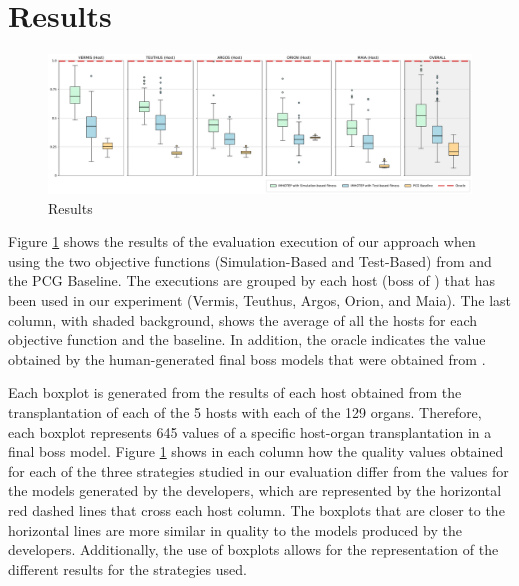 \section{Results}
\label{sec:Results}

\begin{figure}
    \centering
    \includegraphics[width=\textwidth]{Figures/Imhotep_with_legend_and_oracle_average-v4.pdf}
    \caption{Results}
    \label{fig:results}
\end{figure}

Figure \ref{fig:results} shows the results of the evaluation execution of our approach when using the two objective functions (Simulation-Based and Test-Based) from \ApproachName{} and the PCG Baseline. The executions are grouped by each host (boss of \CaseStudy{}) that has been used in our experiment (Vermis, Teuthus, Argos, Orion, and Maia). The last column, with shaded background, shows the average of all the hosts for each objective function and the baseline. In addition, the oracle indicates the value obtained by the human-generated final boss models that were obtained from \CaseStudy{}. 

Each boxplot is generated from the results of each host obtained from the transplantation of each of the 5 hosts with each of the 129 organs. Therefore, each boxplot represents 645 values of a specific host-organ transplantation in a final boss model. Figure \ref{fig:results} shows in each column how the quality values obtained for each of the three strategies studied in our evaluation differ from the values for the models generated by the developers, which are represented by the horizontal red dashed lines that cross each host column. The boxplots that are closer to the horizontal lines are more similar in quality to the models produced by the developers. Additionally, the use of boxplots allows for the representation of the different results for the strategies used.




